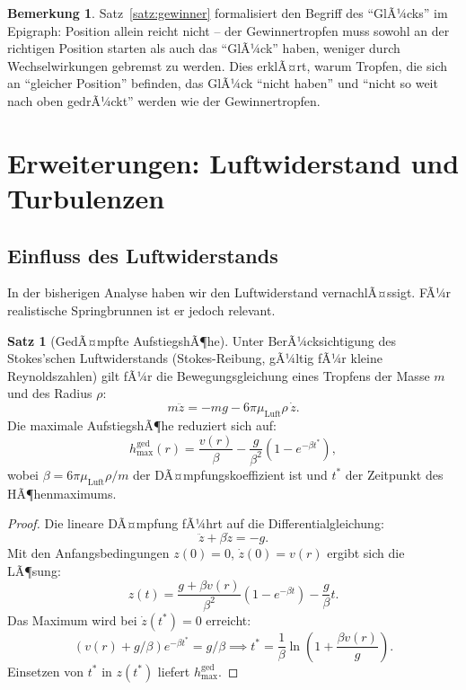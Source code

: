 ﻿\documentclass[a4paper,12pt]{article}
\theoremstyle{definition}
\newtheorem{satz}{Satz}
\newtheorem{bemerkung}{Bemerkung}
\begin{document}
\begin{bemerkung}
Satz~\ref{satz:gewinner} formalisiert den Begriff des ``GlÃ¼cks'' im Epigraph: Position
allein reicht nicht -- der Gewinnertropfen muss sowohl an der richtigen Position starten
als auch das ``GlÃ¼ck'' haben, weniger durch Wechselwirkungen gebremst zu werden.
Dies erklÃ¤rt, warum Tropfen, die sich an ``gleicher Position'' befinden, das GlÃ¼ck
``nicht haben'' und ``nicht so weit nach oben gedrÃ¼ckt'' werden wie der Gewinnertropfen.
\end{bemerkung}

\section{Erweiterungen: Luftwiderstand und Turbulenzen}

\subsection{Einfluss des Luftwiderstands}

In der bisherigen Analyse haben wir den Luftwiderstand vernachlÃ¤ssigt.
FÃ¼r realistische Springbrunnen ist er jedoch relevant.

\begin{satz}[GedÃ¤mpfte AufstiegshÃ¶he]
\label{satz:daempfung}
    Unter BerÃ¼cksichtigung des Stokes'schen Luftwiderstands (Stokes-Reibung,
    gÃ¼ltig fÃ¼r kleine Reynoldszahlen) gilt fÃ¼r die Bewegungsgleichung eines Tropfens
    der Masse $m$ und des Radius $\rho$:
    \[
    m\ddot{z} = -mg - 6\pi\mu_{\text{Luft}}\rho\,\dot{z}.
    \]
    Die maximale AufstiegshÃ¶he reduziert sich auf:
    \[
    h_{\max}^{\text{ged}}(r) = \frac{v(r)}{\beta} - \frac{g}{\beta^2}\left(1 - e^{-\beta t^*}\right),
    \]
    wobei $\beta = 6\pi\mu_{\text{Luft}}\rho / m$ der DÃ¤mpfungskoeffizient ist
    und $t^*$ der Zeitpunkt des HÃ¶henmaximums.
\end{satz}

\begin{proof}
    Die lineare DÃ¤mpfung fÃ¼hrt auf die Differentialgleichung:
    \[
    \ddot{z} + \beta\dot{z} = -g.
    \]
    Mit den Anfangsbedingungen $z(0) = 0$, $\dot{z}(0) = v(r)$ ergibt sich die LÃ¶sung:
    \[
    z(t) = \frac{g+\beta v(r)}{\beta^2}\left(1 - e^{-\beta t}\right) - \frac{g}{\beta}t.
    \]
    Das Maximum wird bei $\dot{z}(t^*) = 0$ erreicht:
    \[
    (v(r) + g/\beta)e^{-\beta t^*} = g/\beta
    \implies t^* = \frac{1}{\beta}\ln\!\left(1 + \frac{\beta v(r)}{g}\right).
    \]
    Einsetzen von $t^*$ in $z(t^*)$ liefert $h_{\max}^{\text{ged}}$. \qedhere
\end{proof}
\end{document}
